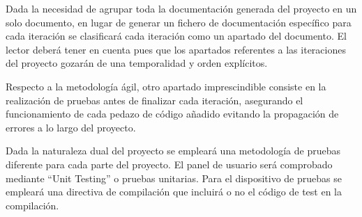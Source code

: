     Dada la necesidad de agrupar toda la documentación generada del proyecto en un solo documento, en lugar de generar un fichero de documentación específico para cada iteración se clasificará cada iteración como un apartado del documento. El lector deberá tener en cuenta pues que los apartados referentes a las iteraciones del proyecto gozarán de una temporalidad y orden explícitos.
    
    Respecto a la metodología ágil, otro apartado imprescindible consiste en la realización de pruebas antes de finalizar cada iteración, asegurando el funcionamiento de cada pedazo de código añadido evitando la propagación de errores a lo largo del proyecto.
    
    Dada la naturaleza dual del proyecto se empleará una metodología de pruebas diferente para cada parte del proyecto. El panel de usuario será comprobado mediante ``Unit Testing'' o pruebas unitarias. Para el dispositivo de pruebas se empleará una directiva de compilación que incluirá o no el código de test en la compilación.

\clearpage

\chapterend{}
